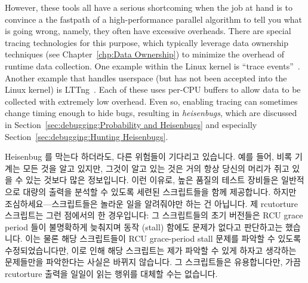 However, these tools all have a serious shortcoming when the job at hand
is to convince a the fastpath of a high-performance parallel algorithm
to tell you what is going wrong, namely, they often have excessive
overheads.
There are special tracing technologies for this purpose, which typically
leverage data ownership techniques
(see Chapter~\ref{chp:Data Ownership})
to minimize the overhead of runtime data collection.
One example within the Linux kernel is
``trace events''~\cite{StevenRostedt2010perfTraceEventP1,StevenRostedt2010perfTraceEventP2,StevenRostedt2010perfTraceEventP3,StevenRostedt2010perfHP+DeathlyMacros}.
Another example that handles userspace (but has not been accepted into
the Linux kernel) is LTTng~\cite{MathieuDesnoyers2009LFCollabSummit}.
Each of these uses per-CPU buffers to allow data to be collected with
extremely low overhead.
Even so, enabling tracing can sometimes change timing enough to
hide bugs, resulting in \emph{heisenbugs}, which are discussed in
Section~\ref{sec:debugging:Probability and Heisenbugs}
and especially Section~\ref{sec:debugging:Hunting Heisenbugs}.
\fi

Heisenbug 를 막는다 하더라도, 다른 위험들이 기다리고 있습니다.
예를 들어, 비록 기계는 모든 것을 알고 있지만, 그것이 알고 있는 것은 거의 항상
당신의 머리가 쥐고 있을 수 있는 것보다 많은 정보입니다.
이런 이유로, 높은 품질의 테스트 장비들은 일반적으로 대량의 출력을 분석할 수
있도록 세련된 스크립트들을 함께 제공합니다.
하지만 조심하세요---스크립트들은 놀라운 일을 알려줘야만 하는 건 아닙니다.
제 rcutorture 스크립트는 그런 점에서의 한 경우입니다: 그 스크립트들의 초기
버전들은 RCU grace period 들이 불명확하게 늦춰지며 동작 (stall) 함에도 문제가
없다고 판단하고는 했습니다.
이는 물론 해당 스크립트들이 RCU grace-period stall 문제를 파악할 수 있도록
수정되었습니다만, 이로 인해 해당 스크립트는 제가 파악할 수 있게 하자고 생각하는
문제들만을 파악한다는 사실은 바뀌지 않습니다.
그 스크립트들은 유용합니다만, 가끔 rcutorture 출력을 일일이 읽는 행위를 대체할
수는 없습니다.

